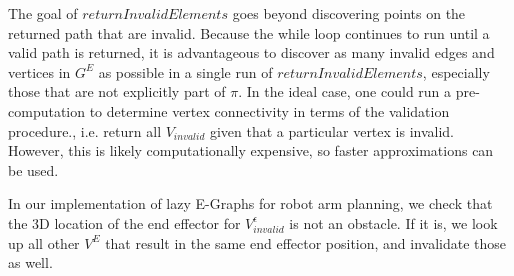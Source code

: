 \documentclass[letterpaper, 10 pt, conference]{ieeeconf}  %
\begin{document}
The goal of $returnInvalidElements$ goes beyond discovering points on the
returned path that are invalid. Because the while loop continues to run until a
valid path is returned, it is advantageous to discover as many invalid edges and
vertices in $G^E$ as possible in a single run of $returnInvalidElements$,
especially those that are not explicitly part of $\pi$.  In the ideal case, one
could run a pre-computation to determine vertex connectivity in terms of the
validation procedure., i.e. return all $V_{invalid}$ given that a particular
vertex is invalid. However, this is likely computationally expensive, so faster
approximations can be used.

In our implementation of lazy E-Graphs for robot arm planning, we check that the
3D location of the end effector for $V_{invalid}^\epsilon$ is not an obstacle.
If it is, we look up all other $V^E$ that result in the same end effector
position, and invalidate those as well.
\end{document}
